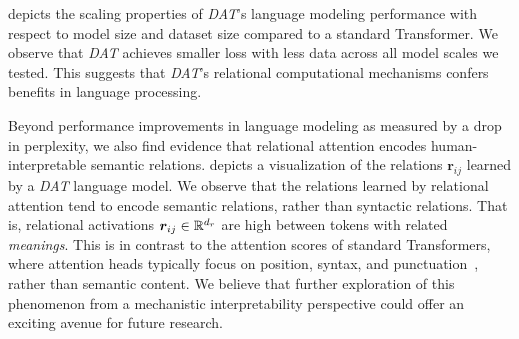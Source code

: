 depicts the scaling properties of \textit{DAT}'s language modeling performance with respect to model size and dataset size compared to a standard Transformer. We observe that \textit{DAT} achieves smaller loss with less data across all model scales we tested. This suggests that \textit{DAT}'s relational computational mechanisms confers benefits in language processing.

Beyond performance improvements in language modeling as measured by a drop in perplexity, we also find evidence that relational attention encodes human-interpretable semantic relations.  depicts a visualization of the relations $\boldsymbol{r}_{ij}$ learned by a \textit{DAT} language model. We observe that the relations learned by relational attention tend to encode semantic relations, rather than syntactic relations. That is, relational activations $\boldsymbol{r}_{ij} \in \mathbb{R}^{d_r}$ are high between tokens with related \textit{meanings}. This is in contrast to the attention scores of standard Transformers, where attention heads typically focus on position, syntax, and punctuation~\citep{clark2019doesbertlookat,htut2019attentionheadsberttrack,elhage2021mathematical}, rather than semantic content. We believe that further exploration of this phenomenon from a mechanistic interpretability perspective could offer an exciting avenue for future research.


